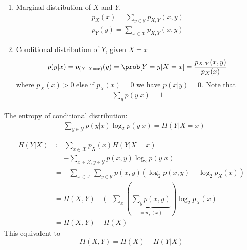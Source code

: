 \documentclass[mfit.tex]{subfiles}
\begin{document}
\begin{rem}[Recall]
  \begin{enumerate}[label=(\alph*)]
    \item Marginal distribution of $X$ and $Y$.
    \begin{align*}
      p_X(x) = \sum_{y \in \mathcal{Y}} p_{X,Y} (x,y) \\
      p_Y(y) = \sum_{x \in \mathcal{X}} p_{X,Y} (x,y)
    \end{align*}
    \item Conditional distribution of $Y$, given $X=x$
    \begin{align*}
      p(y|x) = p_{(Y|X=x)} (y) = \prob[Y = y | X = x] = \frac{p_{X,Y}(x,y)}{p_X(x)}
    \end{align*}
    where $p_X(x) > 0$ else if $p_X(x) = 0$ we have $p(x|y) = 0$.
    Note that
    \begin{align*}
      \sum_y p(y|x) = 1
    \end{align*}
  \end{enumerate}
\end{rem}

The entropy of conditional distribution:
\begin{align*}
  - \sum_{y \in \mathcal{Y}} p(y|x) \log_2 p(y|x) = H(Y|X=x)
\end{align*}

\begin{defi}
  \begin{align*}
    H(Y|X) &\coloneqq \sum_{x \in \mathcal{X}} p_X(x) H(Y|X=x) \\
    &= - \sum_{x \in \mathcal{X}, y \in \mathcal{Y}} p(x,y) \log_2 p(y|x) \\
    &= - \sum_{x \in \mathcal{X}} \sum_{y \in \mathcal{Y}} p(x,y) (\log_2 p(x,y) - \log_2 p_X(x)) \\
    &= H(X,Y) - (-\sum_x (\underbrace{\sum_y p(x,y)}_{= p_X(x)}) \log_2 p_X(x) \\
    &= H(X,Y) - H(X)
  \end{align*}
  This equivalent to
  \[ H(X,Y) = H(X) + H(Y|X) \]
\end{defi}
\end{document}
